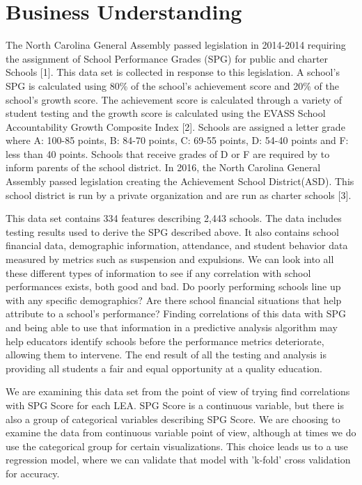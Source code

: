 \documentclass[11pt]{article}
\begin{document}
    \section{Business Understanding}\label{business-understanding}

The North Carolina General Assembly passed legislation in 2014-2014
requiring the assignment of School Performance Grades (SPG) for public
and charter Schools {[}1{]}. This data set is collected in response to
this legislation. A school's SPG is calculated using 80\% of the
school's achievement score and 20\% of the school's growth score. The
achievement score is calculated through a variety of student testing and
the growth score is calculated using the EVASS School Accountability
Growth Composite Index {[}2{]}. Schools are assigned a letter grade
where A: 100-85 points, B: 84-70 points, C: 69-55 points, D: 54-40
points and F: less than 40 points. Schools that receive grades of D or F
are required by to inform parents of the school district. In 2016, the
North Carolina General Assembly passed legislation creating the
Achievement School District(ASD). This school district is run by a
private organization and are run as charter schools {[}3{]}.

This data set contains 334 features describing 2,443 schools. The data
includes testing results used to derive the SPG described above. It also
contains school financial data, demographic information, attendance, and
student behavior data measured by metrics such as suspension and
expulsions. We can look into all these different types of information to
see if any correlation with school performances exists, both good and
bad. Do poorly performing schools line up with any specific
demographics? Are there school financial situations that help attribute
to a school's performance? Finding correlations of this data with SPG
and being able to use that information in a predictive analysis
algorithm may help educators identify schools before the performance
metrics deteriorate, allowing them to intervene. The end result of all
the testing and analysis is providing all students a fair and equal
opportunity at a quality education.

We are examining this data set from the point of view of trying find
correlations with SPG Score for each LEA. SPG Score is a continuous
variable, but there is also a group of categorical variables describing
SPG Score. We are choosing to examine the data from continuous variable
point of view, although at times we do use the categorical group for
certain visualizations. This choice leads us to a use regression model,
where we can validate that model with 'k-fold' cross validation for
accuracy.
\end{document}
